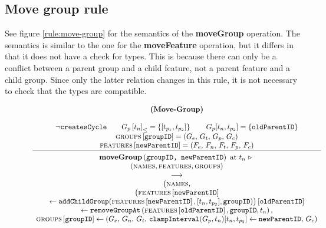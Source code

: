 \subsection{Move group rule}
\label{sub:move-group-rule}
See figure \vref{rule:move-group} for the semantics of the \textbf{moveGroup} operation. The semantics is similar to the one for the \textbf{moveFeature} operation, but it differs in that it does not have a check for types. This is because there can only be a conflict between a parent group and a child feature, not a parent feature and a child group. Since only the latter relation changes in this rule, it is not necessary to check that the types are compatible.

\begin{figure}[h]
    \renewcommand{\arraystretch}{1.1}
    \sossize$$\begin{array}{c}
      \ntyperule{Move-Group}
      {\\
        \neg \var{createsCycle} \qquad
        \containing{G_p}{t_n} = \set{\interval{t_{p_1}}{t_{p_2}}} \qquad
        G_p \interval{t_n}{t_{p_2}} = \set{\var{oldParentID}} \\
        \lookup{\groups{}}{\var{groupID}} = \left( G_e,\, G_t,\, G_p,\, G_c \right) \\
        \lookup{\features{}}{\var{newParentID}} = \left(F_e,\, F_n,\, F_t,\, F_p,\, F_c \right)
      }
      {
        \textbf{moveGroup}\left( \var{groupID, newParentID}\right) \text{ at } t_n \shove \\
        (\names{}, \features{}, \groups{}) \\
        \transition \\
        \big(\names,\\
        \lookup{\big(\lookup{\features{}}{\var{newParentID}} \\
        \assign \var{addChildGroup}(\lookup{\features{}}{\var{newParentID}}, \interval{t_n}{t_{p_2}}, \var{groupID})\big)}{\var{oldParentID}} \\
        \assign 
      \var{removeGroupAt}\left(\lookup{\features{}}{\var{oldParentID}}, \var{groupID}, t_n\right), \\
        \lookup{\groups{}}{\var{groupID}} \assign \left( G_e,\, G_n,\, G_t,\, 
        \var{clampInterval}(G_p, t_n)\interval{t_n}{t_{p_2}} \assign \var{newParentID},\, G_c \right)}
    \end{array}$$
  \caption{\label{rule:move-group}}
\end{figure}


